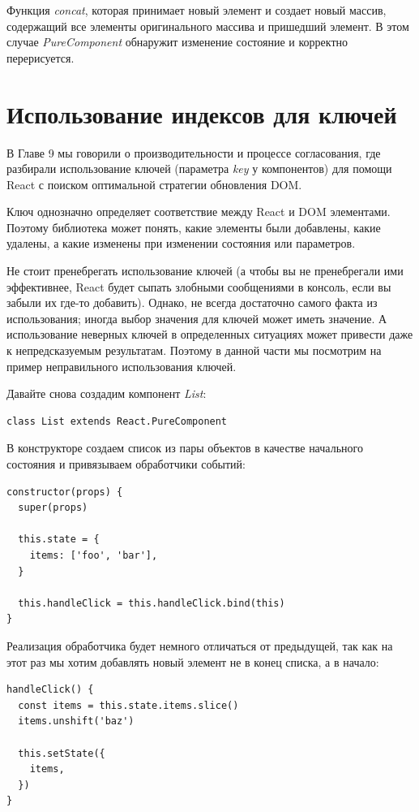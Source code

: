 Функция \textit{concat}, которая принимает новый элемент и создает новый массив, содержащий все элементы оригинального массива и пришедший элемент. В этом случае \textit{PureComponent} обнаружит изменение состояние и корректно перерисуется.


\section{Использование индексов для ключей}

В Главе 9 мы говорили о производительности и процессе согласования, где разбирали использование ключей (параметра \textit{key} у компонентов) для помощи React с поиском оптимальной стратегии обновления DOM.

Ключ однозначно определяет соответствие между React и DOM элементами. Поэтому библиотека может понять, какие элементы были добавлены, какие удалены, а какие изменены при изменении состояния или параметров. 

Не стоит пренебрегать использование ключей (а чтобы вы не пренебрегали ими эффективнее, React будет сыпать злобными сообщениями в консоль, если вы забыли их где-то добавить). Однако, не всегда достаточно самого факта из использования; иногда выбор значения для ключей может иметь значение. А использование неверных ключей в определенных ситуациях может привести даже к непредсказуемым результатам. Поэтому в данной части мы посмотрим на пример неправильного использования ключей.

Давайте снова создадим компонент \textit{List}:

\begin{lstlisting}
class List extends React.PureComponent
\end{lstlisting}

В конструкторе создаем список из пары объектов в качестве начального состояния и привязываем обработчики событий:

\begin{lstlisting}
constructor(props) {
  super(props)
  
  this.state = {
    items: ['foo', 'bar'],
  }
  
  this.handleClick = this.handleClick.bind(this)
}
\end{lstlisting}

Реализация обработчика будет немного отличаться от предыдущей, так как на этот раз мы хотим добавлять новый элемент не в конец списка, а в начало:

\begin{lstlisting}
handleClick() {
  const items = this.state.items.slice()
  items.unshift('baz')
  
  this.setState({
    items,
  })
}
\end{lstlisting}

